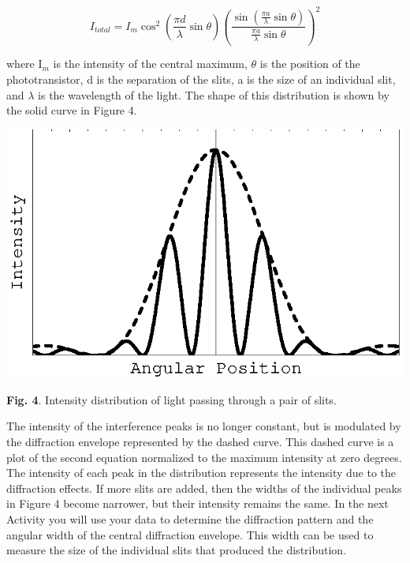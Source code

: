 \begin{displaymath} I_{total} = I_m \cos^2 (\frac {\pi d} {\lambda} \sin \theta ) (\frac {\sin (\frac {\pi a} {\lambda} \sin \theta)} {\frac {\pi a} {\lambda} \sin \theta} )^2 \end{displaymath}

where I\( _{m} \) is the intensity of the central maximum, \( \theta  \)
is the position of the phototransistor, d is the separation of the
slits, a is the size of an individual slit, and \( \lambda  \) is
the wavelength of the light. The shape of this distribution is shown
by the solid curve in Figure 4.

\vspace{0.3cm}
{\centering \includegraphics{diffraction_of_light_fig_4.eps} \par}
\vspace{0.3cm}

{\centering \textbf{Fig. 4}. Intensity distribution of light passing
through a pair of slits.\par}

The intensity of the interference peaks is no longer constant, but
is modulated by the diffraction envelope represented by the dashed
curve. This dashed curve is a plot of the second equation normalized
to the maximum intensity at zero degrees. The intensity of each peak
in the distribution represents the intensity due to the diffraction
effects. If more slits are added, then the widths of the individual
peaks in Figure 4 become narrower, but their intensity remains the
same. In the next Activity you will use your data to determine the
diffraction pattern and the angular width of the central diffraction
envelope. This width can be used to measure the size of the individual
slits that produced the distribution.

